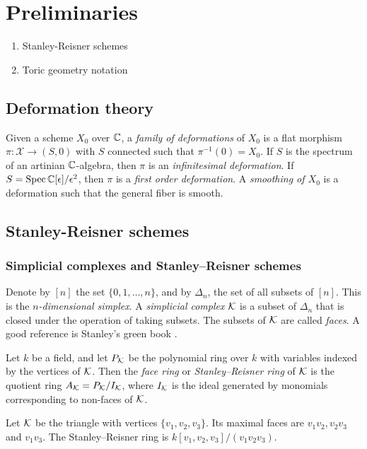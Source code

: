 \chapter{Preliminaries}
\label{sec:prelims}

\begin{enumerate}
	\item Stanley-Reisner schemes
	\item Toric geometry notation
\end{enumerate}

\section{Deformation theory}

Given a scheme $X_0$ over $\mathbb{C}$, a \emph{family of deformations} of $X_0$ is a flat morphism $\pi:\mathscr X \to (S,0)$ with $S$ connected such that $\pi^{-1}(0)=X_0$. If $S$ is the spectrum of an artinian $\mathbb{C}$-algebra, then $\pi$ is an \emph{infinitesimal deformation}. If $S=\operatorname{Spec} \mathbb{C}[\epsilon]/\epsilon^2$, then  $\pi$ is a \emph{first order deformation}. A \emph{smoothing of $X_0$} is a deformation such that the general fiber is smooth.

\section{Stanley-Reisner schemes}

\subsection{Simplicial complexes and Stanley--Reisner schemes}

Denote by $[n]$ the set $\{0,1,\ldots,n\}$, and by $\Delta_n$, the set of all subsets of $[n]$. This is the \emph{$n$-dimensional simplex}. A \emph{simplicial complex} $\mathcal{K}$ is a subset of $\Delta_n$ that is closed under the operation of taking subsets. The subsets of $\mathcal{K}$ are called \emph{faces}. A good reference is Stanley's green book \cite{stanley_green}.

Let $k$ be a field, and let $P_{\mathcal{K}}$ be the polynomial ring over $k$ with variables indexed by the vertices of $\mathcal{K}$. Then the \emph{face ring} or \emph{Stanley--Reisner ring} of $\mathcal{K}$ is the quotient ring $A_{\mathcal{K}} = P_{\mathcal{K}}/I_{\mathcal{K}}$, where $I_{\mathcal{K}}$ is the ideal generated by monomials corresponding to non-faces of $\mathcal{K}$. 

\begin{example}
Let $\mathcal{K}$ be the triangle with vertices $\{ v_1,v_2,v_3\}$. Its maximal faces are $v_1v_2, v_2v_3$ and $v_1v_3$. The Stanley--Reisner ring is $k[v_1,v_2,v_3]/(v_1v_2v_3)$.
\end{example}

